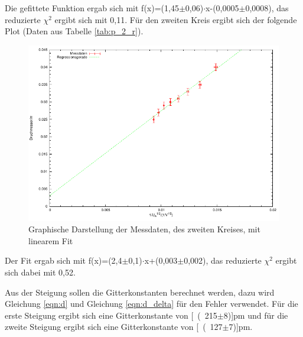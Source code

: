 \documentclass[12pt,a4paper]{article}
\begin{document}
Die gefittete Funktion ergab sich mit f(x)=(1,45$\pm$0,06)$\cdot$x-(0,0005$\pm$0,0008), das reduzierte $\chi^2$ ergibt sich mit 0,11.
\newpage
Für den zweiten Kreis ergibt sich der folgende Plot (Daten aus Tabelle \ref{tab:p_2_r}).
\begin{figure}[H] 
  \centering
    \includegraphics[scale = 1]{kreis_2.pdf}
  	\caption[Graphische Darstellung der Messdaten, des zweiten Kreises, mit linearem Fit]{Graphische Darstellung der Messdaten, des zweiten Kreises, mit linearem Fit}
  \label{fig:plot_1}
\end{figure}

Der Fit ergab sich mit f(x)=(2,4$\pm$0,1)$\cdot$x+(0,003$\pm$0,002), das reduzierte $\chi^2$ ergibt sich dabei mit 0,52.

Aus der Steigung sollen die Gitterkonstanten berechnet werden, dazu wird Gleichung \ref{eqn:d} und Gleichung \ref{eqn:d_delta} für den Fehler verwendet. Für die erste Steigung ergibt sich eine Gitterkonstante von \unit[(215$\pm$8)]{pm} und für die zweite Steigung ergibt sich eine Gitterkonstante von \unit[(127$\pm$7)]{pm}.
\end{document}
